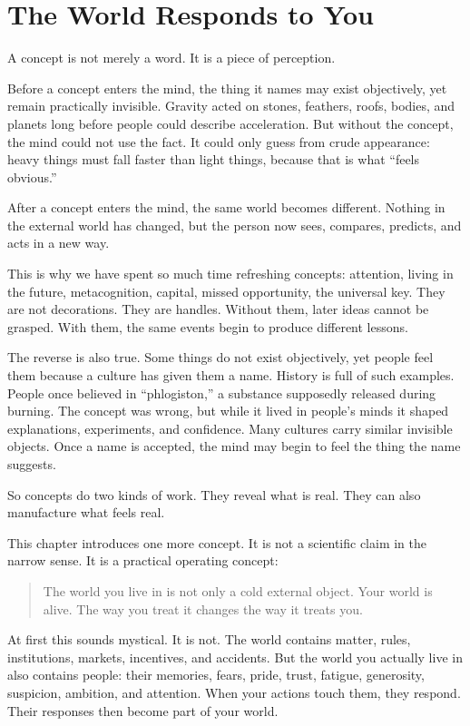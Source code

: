 \chapter{The World Responds to You}

A concept is not merely a word. It is a piece of perception.

Before a concept enters the mind, the thing it names may exist objectively, yet remain practically invisible. Gravity acted on stones, feathers, roofs, bodies, and planets long before people could describe acceleration. But without the concept, the mind could not use the fact. It could only guess from crude appearance: heavy things must fall faster than light things, because that is what ``feels obvious.''

After a concept enters the mind, the same world becomes different. Nothing in the external world has changed, but the person now sees, compares, predicts, and acts in a new way.

This is why we have spent so much time refreshing concepts: attention, living in the future, metacognition, capital, missed opportunity, the universal key. They are not decorations. They are handles. Without them, later ideas cannot be grasped. With them, the same events begin to produce different lessons.

The reverse is also true. Some things do not exist objectively, yet people feel them because a culture has given them a name. History is full of such examples. People once believed in ``phlogiston,'' a substance supposedly released during burning. The concept was wrong, but while it lived in people's minds it shaped explanations, experiments, and confidence. Many cultures carry similar invisible objects. Once a name is accepted, the mind may begin to feel the thing the name suggests.

So concepts do two kinds of work. They reveal what is real. They can also manufacture what feels real.

This chapter introduces one more concept. It is not a scientific claim in the narrow sense. It is a practical operating concept:

\begin{quote}
The world you live in is not only a cold external object. Your world is alive. The way you treat it changes the way it treats you.
\end{quote}

At first this sounds mystical. It is not. The world contains matter, rules, institutions, markets, incentives, and accidents. But the world you actually live in also contains people: their memories, fears, pride, trust, fatigue, generosity, suspicion, ambition, and attention. When your actions touch them, they respond. Their responses then become part of your world.

